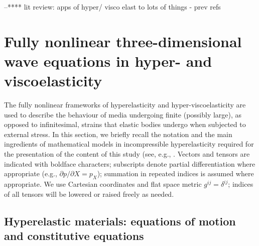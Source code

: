 \documentclass[11pt,letter,subeqn,fleqn]{article}
\numberwithin{equation}{section}
\numberwithin{table}{section}
\numberwithin{figure}{section}
\begin{document}



--**** lit review: apps of hyper/ visco elast to lots of things - prev refs

\section{Fully nonlinear three-dimensional wave equations in hyper- and viscoelasticity }   \label{Sec:HyperViscoelasticity}

The fully nonlinear frameworks of hyperelasticity and hyper-viscoelasticity are used to describe the behaviour of media undergoing finite (possibly large), as opposed to infinitesimal, strains that elastic bodies undergo when subjected to external stress. In this section, we briefly recall the notation and the main ingredients of mathematical models in incompressible hyperelasticity required for the presentation of the content of this study (see, e.g., \cite{ciarlet1988mathematical, Marsd, Bower, thesisBader}. Vectors and tensors are indicated with boldface characters; subscripts denote partial differentiation where appropriate (e.g., $\partial p/\partial X=p_X$); summation in repeated indices is assumed where appropriate. We use Cartesian coordinates and flat space metric $g^{ij}=\delta^{ij}$; indices of all tensors will be lowered or raised freely as needed.

\subsection{Hyperelastic materials: equations of motion and constitutive equations}
\end{document}
